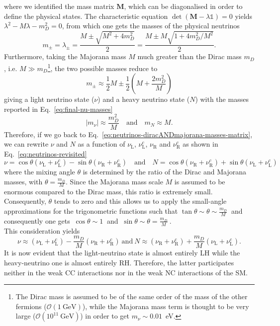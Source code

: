 where we identified the mass matrix $\mathbf{M}$, which can be diagonalised in order to define the physical states. 
The characteristic equation $\det(\mathbf{M} - \lambda \mathbb{1}) = 0$ yields $\lambda^2 - M\lambda - m_D^2 = 0$, 
from which one gets the masses of the physical neutrinos 
\begin{equation*}
    m_{\pm} = \lambda_{\pm} = \frac{M \pm \sqrt{M^2 + 4m_D^2}}{2} = \frac{M \pm M\sqrt{1 + 4m_D^2/M^2}}{2}.
\end{equation*}
Furthermore, taking the Majorana mass $M$ much greater than the Dirac mass $m_D$, 
i.e. $M \gg m_D$\footnote{The Dirac mass is assumed to be of the same order of the mass of the other fermions ($\mathcal{O}(1~\text{GeV})$), 
while the Majorana mass term is thought to be very large ($\mathcal{O}(10^{11}~\text{GeV})$) in order to get $m_\nu \sim 0.01$~eV.}, 
the two possible masses reduce to 
\begin{equation*}
    m_{\pm} \approx \frac{1}{2}M \pm \frac{1}{2}\left( M + \frac{2m_D^2}{M} \right)
\end{equation*}
giving a light neutrino state ($\nu$) and a heavy neutrino state ($N$) with the masses reported in Eq.~\ref{eq:final-nu-masses}
\begin{equation}
    \label{eq:final-nu-masses}
    |m_{\nu}| \approx \frac{m_D^2}{M} \quad \text{and} \quad m_N \approx M.
\end{equation} 
Therefore, if we go back to Eq.~\ref{eq:neutrinos-diracANDmajorana-masses-matrix}, we can rewrite $\nu$ and $N$ as a function of
$\nu_\text{L}$, $\nu_\text{L}^c$, $\nu_\text{R}$ and $\nu_\text{R}^c$ as shown in Eq.~\ref{eq:neutrinos-revisited}
\begin{equation}
    \label{eq:neutrinos-revisited}
    \nu = \cos\theta (\nu_\text{L} + \nu_\text{L}^c) - \sin\theta (\nu_\text{R} + \nu_\text{R}^c) \quad \text{and} \quad N = \cos\theta (\nu_\text{R} + \nu_\text{R}^c) + \sin\theta (\nu_\text{L} + \nu_\text{L}^c)
\end{equation}
where the mixing angle $\theta$ is determined by the ratio of the Dirac and Majorana masses, with $\theta = \frac{m_D}{M}$. 
Since the Majorana mass scale $M$ is assumed to be enormous compared to the Dirac mass, this ratio is extremely small. 
Consequently, $\theta$ tends to zero and this allows us to apply the small-angle approximations for the trigonometric functions such that
$\tan\theta \sim \theta \sim \frac{m_D}{M}~$ and consequently one gets $~\cos\theta \sim 1~$ and $~\sin\theta \sim \theta = \frac{m_D}{M}~$.\\
This consideration yields
\begin{equation*}
    \nu \approx (\nu_\text{L} + \nu_\text{L}^c) - \frac{m_D}{M}(\nu_\text{R} + \nu_\text{R}^c) ~ \text{and} ~ N \approx (\nu_\text{R} + \nu_\text{R}^c) + \frac{m_D}{M}(\nu_\text{L} + \nu_\text{L}^c).
\end{equation*}
It is now evident that the light-neutrino state is almost entirely \ac{LH} while the heavy-neutrino one is almost entirely \ac{RH}. 
Therefore, the latter participates neither in the weak \ac{CC} interactions nor in the weak \ac{NC} interactions of the \ac{SM}.


